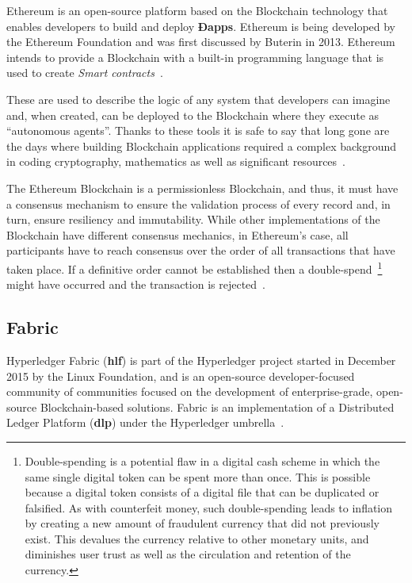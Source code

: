   Ethereum is an open-source platform based on the Blockchain technology that
  enables developers to build and deploy \textbf{Ðapps}. Ethereum is being
  developed by the Ethereum Foundation and was first discussed by Buterin in
  2013.  Ethereum intends to provide a Blockchain with a built-in programming
  language that is used to create \textit{Smart contracts}~\cite{Wood2017}.

  These are used to describe the logic of any system that developers can
  imagine and, when created, can be deployed to the Blockchain where they
  execute as “autonomous agents”.  Thanks to these tools it is safe to say that
  long gone are the days where building Blockchain applications required a
  complex background in coding cryptography, mathematics as well as significant
  resources~\cite{Wood2017,BlockGeeks2017}.

  The Ethereum Blockchain is a permissionless Blockchain, and thus, it must
  have a consensus mechanism to ensure the validation process of every record
  and, in turn, ensure resiliency and immutability. While other implementations
  of the Blockchain have different consensus mechanics, in Ethereum’s case, all
  participants have to reach consensus over the order of all transactions that
  have taken place. If a definitive order cannot be established then a
  double-spend~\footnote{Double-spending is a potential flaw in a digital cash
  scheme in which the same single digital token can be spent more than once.
  This is possible because a digital token consists of a digital file that can
  be duplicated or falsified. As with counterfeit money, such double-spending
  leads to inflation by creating a new amount of fraudulent currency that did
  not previously exist. This devalues the currency relative to other monetary
  units, and diminishes user trust as well as the circulation and retention of
  the currency.} might have occurred and the transaction is
  rejected~\cite{Wood2017}.

  \subsection{Fabric}

  Hyperledger Fabric (\textbf{hlf}) is part of the Hyperledger project started
  in December 2015 by the Linux Foundation, and is an open-source
  developer-focused community of communities focused on the development of
  enterprise-grade, open-source Blockchain-based solutions.  Fabric is an
  implementation of a Distributed Ledger Platform (\textbf{dlp}) under the
  Hyperledger umbrella~\cite{Cachin2016}.

